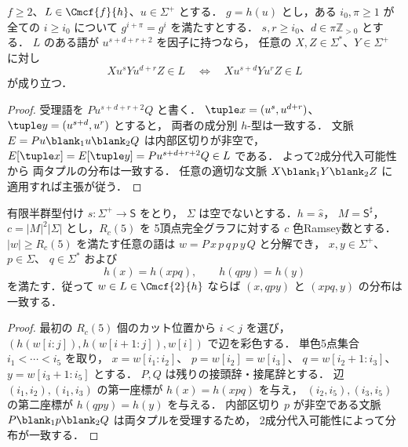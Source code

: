 \begin{lemma}
\label{lem:mcfg-power-transfer}
$f\ge2$、$L\in\Cmcf{f}{h}$、$u\in\Sigma^+$ とする．
$g=h(u)$ とし，ある $i_0,\pi\ge1$ が
全ての $i\ge i_0$ について
$g^{i+\pi}=g^i$ を満たすとする．
$s,r\ge i_0$、$d\in\pi\mathbb Z_{>0}$ とする．
$L$ のある語が $u^{s+d+r+2}$ を因子に持つなら，
任意の $X,Z\in\Sigma^*$、$Y\in\Sigma^+$ に対し
\[
 Xu^sYu^{d+r}Z\in L
 \quad\Longleftrightarrow\quad
 Xu^{s+d}Yu^rZ\in L
\]
が成り立つ．
\end{lemma}
\begin{proof}
受理語を $Pu^{s+d+r+2}Q$ と書く．
$\tuple x=(u^s,u^{d+r})$、
$\tuple y=(u^{s+d},u^r)$ とすると，
両者の成分別 $h$-型は一致する．
文脈 $E=Pu\blank_1u\blank_2Q$ は内部区切りが非空で，
$E[\tuple x]=E[\tuple y]=Pu^{s+d+r+2}Q\in L$ である．
よって2成分代入可能性から
両タプルの分布は一致する．
任意の適切な文脈 $X\blank_1Y\blank_2Z$
に適用すれば主張が従う．
\end{proof}

\begin{lemma}[有界な局所シフト対]
\label{lem:mcfg-local-shift}
有限半群型付け $s:\Sigma^+\to\mathsf S$ をとり，
$\Sigma$ は空でないとする．$h=\widehat s$，
$M=\mathsf S^\sharp$，$c=|M|^2|\Sigma|$ とし，$R_c(5)$ を
5頂点完全グラフに対する $c$ 色Ramsey数とする．
$|w|\ge R_c(5)$ を満たす任意の語は
$w=P\,x\,p\,q\,p\,y\,Q$ と分解でき，
$x,y\in\Sigma^+$、$p\in\Sigma$、
$q\in\Sigma^*$ および
\[
 h(x)=h(xpq),\qquad h(qpy)=h(y)
\]
を満たす．従って $w\in L\in\Cmcf{2}{h}$ ならば
$(x,qpy)$ と $(xpq,y)$ の分布は一致する．
\end{lemma}
\begin{proof}
最初の $R_c(5)$ 個のカット位置から $i<j$ を選び，
$(h(w[i:j]),h(w[i+1:j]),w[i])$ で辺を彩色する．
単色5点集合 $i_1<\cdots<i_5$ を取り，
$x=w[i_1:i_2]$、
$p=w[i_2]=w[i_3]$、
$q=w[i_2+1:i_3]$、
$y=w[i_3+1:i_5]$ とする．
$P,Q$ は残りの接頭辞・接尾辞とする．
辺 $(i_1,i_2),(i_1,i_3)$ の第一座標が
$h(x)=h(xpq)$ を与え，
$(i_2,i_5),(i_3,i_5)$ の第二座標が
$h(qpy)=h(y)$ を与える．
内部区切り $p$ が非空である文脈
$P\blank_1p\blank_2Q$ は両タプルを受理するため，
2成分代入可能性によって分布が一致する．
\end{proof}

